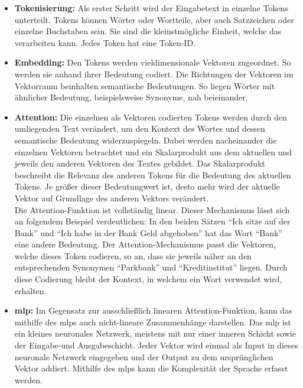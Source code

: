 \documentclass[../main.tex]{subfiles}
\begin{document}
\begin{itemize}

\item \textbf{Tokenisierung:} Als erster Schritt wird der Eingabetext in einzelne Tokens unterteilt. Tokens können Wörter oder Wortteile, aber auch Satzzeichen oder einzelne Buchstaben sein. Sie sind die kleinstmögliche Einheit, welche das  verarbeiten kann. Jedes Token hat eine Token-ID.\cite{architecture}

\item \textbf{Embedding:} Den Tokens werden vieldimensionale Vektoren zugeordnet. So werden sie anhand ihrer Bedeutung codiert. Die Richtungen der Vektoren im Vektorraum beinhalten semantische Bedeutungen. So liegen Wörter mit ähnlicher Bedeutung, beispielsweise Synonyme, nah beieinander.\cite{embedding}

\item \textbf{Attention:} Die einzelnen als Vektoren codierten Tokens werden durch den umliegenden Text verändert, um den Kontext des Wortes und dessen semantische Bedeutung widerzuspiegeln. Dabei werden nacheinander die einzelnen Vektoren betrachtet und ein Skalarprodukt aus dem aktuellen und jeweils den anderen Vektoren des Textes gebildet. Das Skalarprodukt beschreibt die Relevanz des anderen Tokens für die Bedeutung des aktuellen Tokens. Je größer dieser Bedeutungwert ist, desto mehr wird der aktuelle Vektor auf Grundlage des anderen Vektors verändert.\\
Die Attention-Funktion ist vollständig linear. Dieser Mechanismus lässt sich an folgendem Beispiel verdeutlichen: In den beiden Sätzen “Ich sitze auf der Bank” und “Ich habe in der Bank Geld abgehoben” hat das Wort “Bank” eine andere Bedeutung. Der Attention-Mechanismus passt die Vektoren, welche dieses Token codieren, so an, dass sie jeweils näher an den entsprechenden Synonymen “Parkbank” und “Kreditinstitut” liegen. Durch diese Codierung bleibt der Kontext, in welchem ein Wort verwendet wird, erhalten.\cite{attention, attention2} 

\item \textbf{\acrfull{mlp}:} Im Gegensatz zur ausschließlich linearen Attention-Funktion, kann das  mithilfe des \acrshort{mlp}s auch nicht-lineare Zusammenhänge darstellen. Das \acrshort{mlp} ist ein kleines neuronales Netzwerk, meistens mit nur einer inneren Schicht sowie der Eingabe-und Ausgabeschicht. Jeder Vektor wird einmal als Input in dieses neuronale Netzwerk eingegeben und der Output zu dem ursprünglichen Vektor addiert. Mithilfe des \acrshort{mlp}s kann die Komplexität der Sprache erfasst werden.


\end{itemize}
\end{document}
